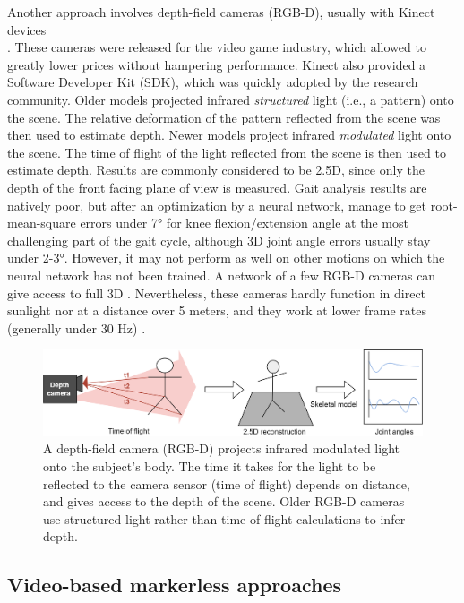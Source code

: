 Another approach involves depth-field cameras (RGB-D), usually with Kinect devices \\\cite{Kinect2022}. These cameras were released for the video game industry, which allowed to greatly lower prices without hampering performance. Kinect also provided a Software Developer Kit (SDK), which was quickly adopted by the research community. Older models projected infrared \textit{structured} light (i.e., a pattern) onto the scene. The relative deformation of the pattern reflected from the scene was then used to estimate depth. Newer models project infrared \textit{modulated} light onto the scene. The time of flight of the light reflected from the scene is then used to estimate depth. Results are commonly considered to be 2.5D, since only the depth of the front facing plane of view is measured. Gait analysis results are natively poor, but after an optimization by a neural network, \cite{Guo2022} manage to get root-mean-square errors under 7° for knee flexion/extension angle at the most challenging part of the gait cycle, although 3D joint angle errors usually stay under 2-3°. However, it may not perform as well on other motions on which the neural network has not been trained. A network of a few RGB-D cameras can give access to full 3D \cite{Carraro2017,Choppin2013,Colombel2020}. Nevertheless, these cameras hardly function in direct sunlight nor at a distance over 5 meters, and they work at lower frame rates (generally under 30 Hz) \cite{Han2013, Pagliari2015}. 

\begin{figure}[hbtp]
	\centering
	\def\svgwidth{1\columnwidth}
	\fontsize{10pt}{10pt}\selectfont
	\includegraphics[width=\linewidth]{"../Chap1/Figures/Fig_Depth.png"}
	\caption{A depth-field camera (RGB-D) projects infrared modulated light onto the subject's body. The time it takes for the light to be reflected to the camera sensor (time of flight) depends on distance, and gives access to the depth of the scene.	Older RGB-D cameras use structured light rather than time of flight calculations to infer depth.}
	\label{fig_depth}
\end{figure}

\FloatBarrier
\subsection{Video-based markerless approaches}

